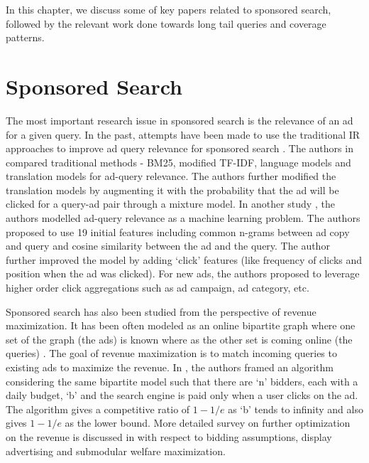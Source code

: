 In this chapter, we discuss some of key papers related to sponsored search, followed by the relevant work done towards long tail queries and coverage patterns.

\section{Sponsored Search}

The most important research issue in sponsored search is the relevance of an ad for a given query. In the past, attempts have been made to use the traditional IR approaches to improve ad query relevance for sponsored search \cite{raghavan2008evaluating}. The authors in \cite{raghavan2008evaluating} compared traditional methods - BM25, modified TF-IDF, language models and translation models for ad-query relevance. The authors further modified the translation models by augmenting it with the probability that the ad will be clicked for a query-ad pair through a mixture model. In another study \cite{hillard2010improving}, the authors modelled ad-query relevance as a machine learning problem. The authors proposed to use 19 initial features including common n-grams between ad copy and query and cosine similarity between the ad and the query. The author further improved the model by adding `click' features (like frequency of clicks and position when the ad was clicked). For new ads, the authors proposed to leverage higher order click aggregations such as ad campaign, ad category, etc. 

Sponsored search has also been studied from the perspective of revenue maximization. It has been often modeled as an online bipartite graph where one set of the graph (the ads) is known where as the other set is coming online (the queries) \cite{mehta2007adwords, mehta2012online}. The goal of revenue maximization is to match incoming queries to existing ads to maximize the revenue. In \cite{mehta2007adwords}, the authors framed an algorithm considering the same bipartite model such that there are `n' bidders, each with a daily budget, `b' and the search engine is paid only when a user clicks on the ad. The algorithm gives a competitive ratio of $1 - 1/e$ as `b' tends to infinity and also gives $1 - 1/e$ as the lower bound. More detailed survey on further optimization on the revenue is discussed in \cite{mehta2012online} with respect to bidding assumptions, display advertising and submodular welfare maximization.

